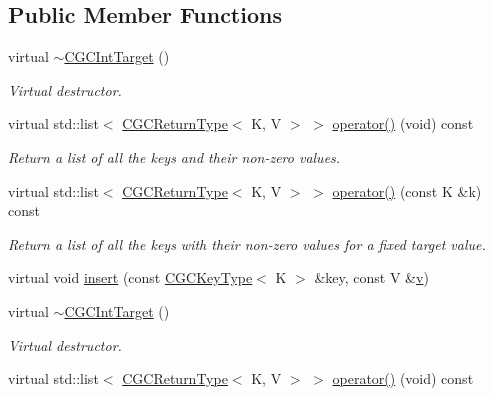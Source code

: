 \subsection*{Public Member Functions}
\begin{DoxyCompactItemize}
\item 
virtual \mbox{\hyperlink{classHadron_1_1CGCIntTarget_a6b808ca161d3dae62109495144178541}{$\sim$\+C\+G\+C\+Int\+Target}} ()
\begin{DoxyCompactList}\small\item\em Virtual destructor. \end{DoxyCompactList}\item 
virtual std\+::list$<$ \mbox{\hyperlink{structHadron_1_1CGCReturnType}{C\+G\+C\+Return\+Type}}$<$ K, V $>$ $>$ \mbox{\hyperlink{classHadron_1_1CGCIntTarget_ae6c0ce90fe1f8a2880984df1e2e44c18}{operator()}} (void) const
\begin{DoxyCompactList}\small\item\em Return a list of all the keys and their non-\/zero values. \end{DoxyCompactList}\item 
virtual std\+::list$<$ \mbox{\hyperlink{structHadron_1_1CGCReturnType}{C\+G\+C\+Return\+Type}}$<$ K, V $>$ $>$ \mbox{\hyperlink{classHadron_1_1CGCIntTarget_a5946627ddb796961b97b7e0c57e32d83}{operator()}} (const K \&k) const
\begin{DoxyCompactList}\small\item\em Return a list of all the keys with their non-\/zero values for a fixed target value. \end{DoxyCompactList}\item 
virtual void \mbox{\hyperlink{classHadron_1_1CGCIntTarget_a2c1e2eaf068abdc394ba3326c7770e77}{insert}} (const \mbox{\hyperlink{structHadron_1_1CGCKeyType}{C\+G\+C\+Key\+Type}}$<$ K $>$ \&key, const V \&\mbox{\hyperlink{adat__devel_2lib_2hadron_2hadron__timeslice_8cc_a716fc87f5e814be3ceee2405ed6ff22a}{v}})
\item 
virtual \mbox{\hyperlink{classHadron_1_1CGCIntTarget_a6b808ca161d3dae62109495144178541}{$\sim$\+C\+G\+C\+Int\+Target}} ()
\begin{DoxyCompactList}\small\item\em Virtual destructor. \end{DoxyCompactList}\item 
virtual std\+::list$<$ \mbox{\hyperlink{structHadron_1_1CGCReturnType}{C\+G\+C\+Return\+Type}}$<$ K, V $>$ $>$ \mbox{\hyperlink{classHadron_1_1CGCIntTarget_ae6c0ce90fe1f8a2880984df1e2e44c18}{operator()}} (void) const

\end{DoxyCompactItemize}
